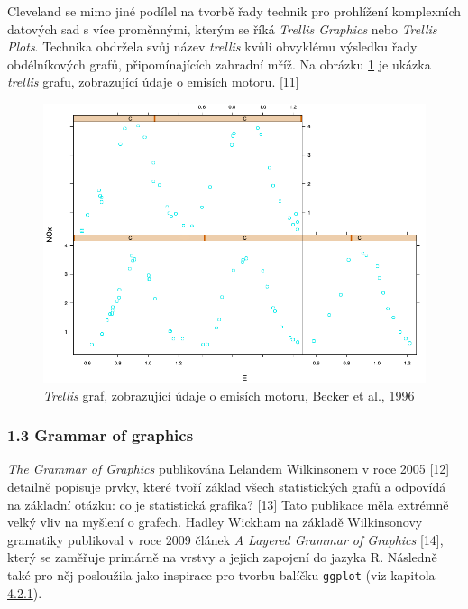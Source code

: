 \documentclass[12pt,]{article}
\begin{document}
\qquad Cleveland se mimo jiné podílel na tvorbě řady technik pro
prohlížení komplexních datových sad s více proměnnými, kterým se říká
\textit{Trellis Graphics} nebo \textit{Trellis Plots}. Technika obdržela
svůj název \textit{trellis} kvůli obvyklému výsledku řady obdélníkových
grafů, připomínajících zahradní mříž. Na obrázku \ref{fig08} je ukázka
\emph{trellis} grafu, zobrazující údaje o emisích motoru. {[}11{]}

\begin{figure}[H]
\centering
    \includegraphics[height = 0.4\textheight]{fig/trellis}
    \caption{\textit{Trellis} graf, zobrazující údaje o emisích motoru, Becker et al., 1996}
    \label{fig08}
 \end{figure}

\newpage

\hypertarget{gg}{\subsubsection{1.3 Grammar of graphics}\label{gg}}

\vspace*{-0.35cm} \qquad \textit{The Grammar of Graphics} publikována
Lelandem Wilkinsonem v roce 2005 {[}12{]} detailně popisuje prvky, které
tvoří základ všech statistických grafů a odpovídá na základní otázku: co
je statistická grafika? {[}13{]} Tato publikace měla extrémně velký vliv
na myšlení o grafech. Hadley Wickham na základě Wilkinsonovy gramatiky
publikoval v roce 2009 článek \emph{A Layered Grammar of Graphics}
{[}14{]}, který se zaměřuje primárně na vrstvy a jejich zapojení do
jazyka R. Následně také pro něj posloužila jako inspirace pro tvorbu
balíčku \texttt{ggplot} (viz kapitola
\protect\hyperlink{ggplot}{4.2.1}).
\end{document}
